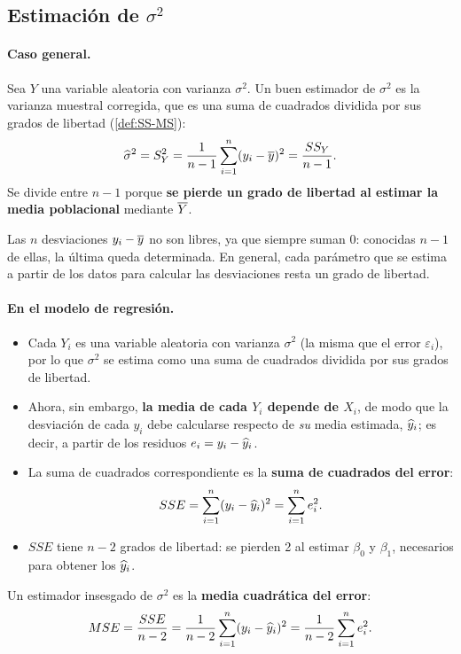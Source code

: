 \subsection{Estimación de \texorpdfstring{$\sigma^2$}{sigma cuadrado}}
\label{sec:t2-sigma}

\paragraph{Caso general.} Sea $Y$ una variable aleatoria con varianza $\sigma^2$. Un buen
estimador de $\sigma^2$ es la varianza muestral corregida, que es una suma de cuadrados
dividida por sus grados de libertad (\cref{def:SS-MS}):
\[
  \widehat{\sigma}^2 = S_Y^2 = \frac{1}{n-1}\sum_{i=1}^{n} (y_i-\overline{y})^2 = \frac{SS_Y}{n-1}.
\]
Se divide entre $n-1$ porque \textbf{se pierde un grado de libertad al estimar la media
poblacional} mediante $\overline{Y}$.

\begin{nota}
  Las $n$ desviaciones $y_i-\overline{y}$ no son libres, ya que siempre suman 0: conocidas $n-1$
  de ellas, la última queda determinada. En general, cada parámetro que se estima a partir de
  los datos para calcular las desviaciones resta un grado de libertad.
\end{nota}

\paragraph{En el modelo de regresión.}
\begin{itemize}
  \item Cada $Y_i$ es una variable aleatoria con varianza $\sigma^2$ (la misma que el error
    $\varepsilon_i$), por lo que $\sigma^2$ se estima como una suma de cuadrados dividida por
    sus grados de libertad.
  \item Ahora, sin embargo, \textbf{la media de cada $Y_i$ depende de $X_i$}, de modo que la
    desviación de cada $y_i$ debe calcularse respecto de \emph{su} media estimada, $\widehat{y}_i$;
    es decir, a partir de los residuos $e_i=y_i-\widehat{y}_i$.
  \item La suma de cuadrados correspondiente es la \textbf{suma de cuadrados del error}:
    \[
      SSE = \sum_{i=1}^{n} (y_i-\widehat{y}_i)^2 = \sum_{i=1}^{n} e_i^2 .
    \]
  \item $SSE$ tiene $n-2$ grados de libertad: se pierden 2 al estimar $\beta_0$ y $\beta_1$,
    necesarios para obtener los $\widehat{y}_i$.
\end{itemize}

\begin{proposicion}
  Un estimador insesgado de $\sigma^2$ es la \textbf{media cuadrática del error}:
  \[
    MSE = \frac{SSE}{n-2} = \frac{1}{n-2}\sum_{i=1}^{n} (y_i-\widehat{y}_i)^2 = \frac{1}{n-2}\sum_{i=1}^{n} e_i^2 .
  \]
\end{proposicion}
